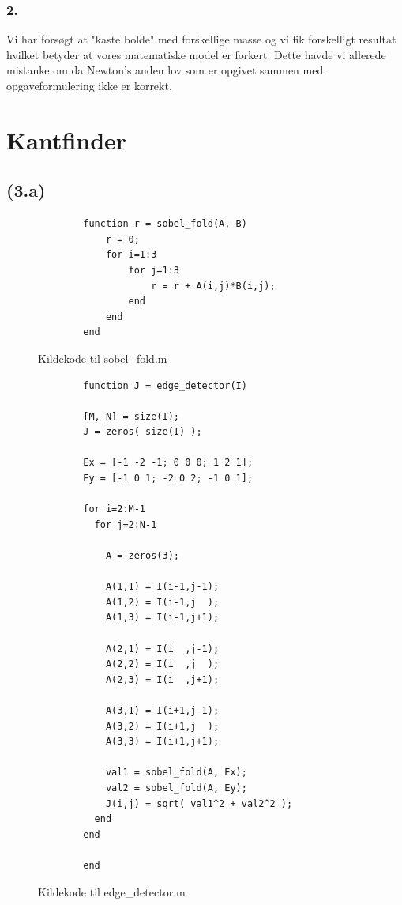 \documentclass{article}
\begin{document}
\subsubsection*{2.}
Vi har forsøgt at "kaste bolde" med forskellige masse og vi fik forskelligt resultat hvilket betyder at vores matematiske model er forkert. Dette havde vi allerede mistanke om da Newton's anden lov som er opgivet sammen med opgaveformulering ikke er korrekt.

\section{Kantfinder}

\subsection*{(3.a)}

\begin{figure}
	\begin{verbatim}
		function r = sobel_fold(A, B)
		    r = 0;
		    for i=1:3
		        for j=1:3
		            r = r + A(i,j)*B(i,j);
		        end
		    end
		end
	\end{verbatim}
	\caption{Kildekode til sobel\_fold.m}
	\label{sobelfold}
\end{figure}

\begin{figure}
	\begin{verbatim}
		function J = edge_detector(I)

		[M, N] = size(I);
		J = zeros( size(I) );

		Ex = [-1 -2 -1; 0 0 0; 1 2 1];
		Ey = [-1 0 1; -2 0 2; -1 0 1];

		for i=2:M-1
		  for j=2:N-1

		    A = zeros(3);

		    A(1,1) = I(i-1,j-1);
		    A(1,2) = I(i-1,j  );
		    A(1,3) = I(i-1,j+1);

		    A(2,1) = I(i  ,j-1);
		    A(2,2) = I(i  ,j  );
		    A(2,3) = I(i  ,j+1);

		    A(3,1) = I(i+1,j-1);
		    A(3,2) = I(i+1,j  );
		    A(3,3) = I(i+1,j+1);

		    val1 = sobel_fold(A, Ex);
		    val2 = sobel_fold(A, Ey);
		    J(i,j) = sqrt( val1^2 + val2^2 );
		  end
		end

		end
	\end{verbatim}
	\caption{Kildekode til edge\_detector.m}
	\label{edgedetector}
\end{figure}
\end{document}

